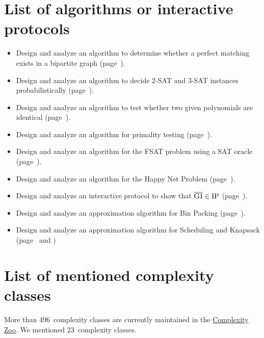 \documentclass[a4paper]{article}
\newcommand{\cls}[1]{\rm{#1}}
\newcommand{\probl}[1]{\text{\textsc{#1}}}
\begin{document}
\begin{appendices}
\section{List of algorithms or interactive protocols}
%
\begin{itemize}
  \item Design and analyze an algorithm to determine whether a perfect matching exists in a bipartite graph (page~\pageref{sec:perfect-matching-algorithm}).
  \item Design and analyze an algorithm to decide 2-SAT and 3-SAT instances probabilistically (page~\pageref{sec:sat-algorithm}).
  \item Design and analyze an algorithm to test whether two given polynomials are identical (page~\pageref{sec:identity-test-polynomials-algorithm}).
  \item Design and analyze an algorithm for primality testing (page~\pageref{sec:primality-test-algorithm}).
  \item Design and analyze an algorithm for the FSAT problem using a SAT oracle (page~\pageref{sec:fsat}).
  \item Design and analyze an algorithm for the Happy Net Problem (page~\pageref{sec:happy-net-problem}).
  \item Design and analyze an interactive protocol to show that $\overline{\probl{GI}} \in \cls{IP}$ (page~\pageref{sec:gic-ip}).
  \item Design and analyze an approximation algorithm for Bin Packing (page~\pageref{sec:approx-bin-pack}).
  \item Design and analyze an approximation algorithm for Scheduling and Knapsack (page~\pageref{sec:scheduling} and \pageref{sec:approx-knapsack})
\end{itemize}


\section{List of mentioned complexity classes}
%
More than 496~complexity classes are currently maintained in the \href{https://complexityzoo.uwaterloo.ca/Complexity_Zoo}{Complexity Zoo}. We mentioned 23~complexity classes.


\end{appendices}
\end{document}
